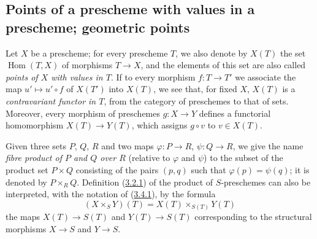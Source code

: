 \subsection{Points of a prescheme with values in a prescheme; geometric
points}
\label{subsection:I.3.4}

\begin{env}[3.4.1]
\label{I.3.4.1}
Let $X$ be a prescheme; for every prescheme $T$, we also denote by $X(T)$
the set $\operatorname{Hom}(T,X)$ of morphisms $T\to X$, and the elements of
this set are also called \emph{points of $X$ with values in $T$}. If to
every morphism $f:T\to T'$ we associate the map $u'\mapsto u'\circ f$ of $X(T')$
into $X(T)$, we see that, for fixed $X$, $X(T)$ is a \emph{contravariant functor
in $T$}, from the category of preschemes to that of sets. Moreover,
every morphism of preschemes $g:X\to Y$ defines a functorial homomorphism
$X(T)\to Y(T)$, which assigns $g\circ v$ to $v\in X(T)$.
\end{env}

\begin{env}[3.4.2]
\label{I.3.4.2}
Given three sets $P$, $Q$, $R$ and two maps
$\varphi:P\to R$, $\psi:Q\to R$, we give the name \emph{fibre product of $P$
and $Q$ over $R$} (relative to $\varphi$ and $\psi$) to the subset of
the product set $P\times Q$ consisting of the pairs $(p,q)$ such that
$\varphi(p)=\psi(q)$; it is denoted by $P\times_R Q$. Definition
(\hyperref[I.3.2.1]{3.2.1}) of the product of $S$-preschemes can also be
interpreted, with the notation of (\hyperref[I.3.4.1]{3.4.1}), by the
formula
\[
  (X\times_S Y)(T)=X(T)\times_{S(T)}Y(T)
  \tag{3.4.2.1}
\]
the maps $X(T)\to S(T)$ and $Y(T)\to S(T)$ corresponding to the structural
morphisms $X\to S$ and $Y\to S$.
\end{env}

